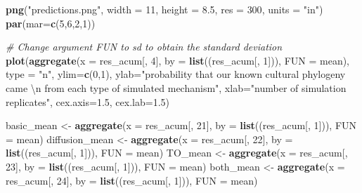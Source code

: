 \documentclass[]{book}
\newenvironment{Shaded}{\begin{snugshade}}{\end{snugshade}}
\newcommand{\KeywordTok}[1]{\textcolor[rgb]{0.13,0.29,0.53}{\textbf{{#1}}}}
\newcommand{\DataTypeTok}[1]{\textcolor[rgb]{0.13,0.29,0.53}{{#1}}}
\newcommand{\DecValTok}[1]{\textcolor[rgb]{0.00,0.00,0.81}{{#1}}}
\newcommand{\FloatTok}[1]{\textcolor[rgb]{0.00,0.00,0.81}{{#1}}}
\newcommand{\CharTok}[1]{\textcolor[rgb]{0.31,0.60,0.02}{{#1}}}
\newcommand{\StringTok}[1]{\textcolor[rgb]{0.31,0.60,0.02}{{#1}}}
\newcommand{\CommentTok}[1]{\textcolor[rgb]{0.56,0.35,0.01}{\textit{{#1}}}}
\newcommand{\NormalTok}[1]{{#1}}
\theoremstyle{definition}
\theoremstyle{definition}
\theoremstyle{definition}
\theoremstyle{remark}
\begin{document}
\begin{Shaded}
\begin{Highlighting}[]
\KeywordTok{png}\NormalTok{(}\StringTok{"predictions.png"}\NormalTok{, }\DataTypeTok{width =} \DecValTok{11}\NormalTok{, }\DataTypeTok{height =} \FloatTok{8.5}\NormalTok{, }\DataTypeTok{res =} \DecValTok{300}\NormalTok{, }\DataTypeTok{units =} \StringTok{"in"}\NormalTok{)}
\KeywordTok{par}\NormalTok{(}\DataTypeTok{mar=}\KeywordTok{c}\NormalTok{(}\DecValTok{5}\NormalTok{,}\DecValTok{6}\NormalTok{,}\DecValTok{2}\NormalTok{,}\DecValTok{1}\NormalTok{))}

\CommentTok{# Change argument FUN to sd to obtain the standard deviation}
\KeywordTok{plot}\NormalTok{(}\KeywordTok{aggregate}\NormalTok{(}\DataTypeTok{x =}\NormalTok{ res_acum[, }\DecValTok{4}\NormalTok{], }\DataTypeTok{by =} \KeywordTok{list}\NormalTok{((res_acum[, }\DecValTok{1}\NormalTok{])), }\DataTypeTok{FUN =}\NormalTok{ mean), }\DataTypeTok{type =} \StringTok{"n"}\NormalTok{, }\DataTypeTok{ylim=}\KeywordTok{c}\NormalTok{(}\DecValTok{0}\NormalTok{,}\DecValTok{1}\NormalTok{), }\DataTypeTok{ylab=}\StringTok{"probability that our known cultural phylogeny came }\CharTok{\textbackslash{}n}\StringTok{ from each type of simulated mechanism"}\NormalTok{, }\DataTypeTok{xlab=}\StringTok{"number of simulation replicates"}\NormalTok{, }\DataTypeTok{cex.axis=}\FloatTok{1.5}\NormalTok{, }\DataTypeTok{cex.lab=}\FloatTok{1.5}\NormalTok{)}


\NormalTok{basic_mean <-}\StringTok{ }\KeywordTok{aggregate}\NormalTok{(}\DataTypeTok{x =}\NormalTok{ res_acum[, }\DecValTok{21}\NormalTok{], }\DataTypeTok{by =} \KeywordTok{list}\NormalTok{((res_acum[, }\DecValTok{1}\NormalTok{])), }\DataTypeTok{FUN =}\NormalTok{ mean)}
\NormalTok{diffusion_mean <-}\StringTok{ }\KeywordTok{aggregate}\NormalTok{(}\DataTypeTok{x =}\NormalTok{ res_acum[, }\DecValTok{22}\NormalTok{], }\DataTypeTok{by =} \KeywordTok{list}\NormalTok{((res_acum[, }\DecValTok{1}\NormalTok{])), }\DataTypeTok{FUN =}\NormalTok{ mean)}
\NormalTok{TO_mean <-}\StringTok{ }\KeywordTok{aggregate}\NormalTok{(}\DataTypeTok{x =}\NormalTok{ res_acum[, }\DecValTok{23}\NormalTok{], }\DataTypeTok{by =} \KeywordTok{list}\NormalTok{((res_acum[, }\DecValTok{1}\NormalTok{])), }\DataTypeTok{FUN =}\NormalTok{ mean)}
\NormalTok{both_mean <-}\StringTok{ }\KeywordTok{aggregate}\NormalTok{(}\DataTypeTok{x =}\NormalTok{ res_acum[, }\DecValTok{24}\NormalTok{], }\DataTypeTok{by =} \KeywordTok{list}\NormalTok{((res_acum[, }\DecValTok{1}\NormalTok{])), }\DataTypeTok{FUN =}\NormalTok{ mean)}
                   

\end{Highlighting}
\end{Shaded}
\end{document}
